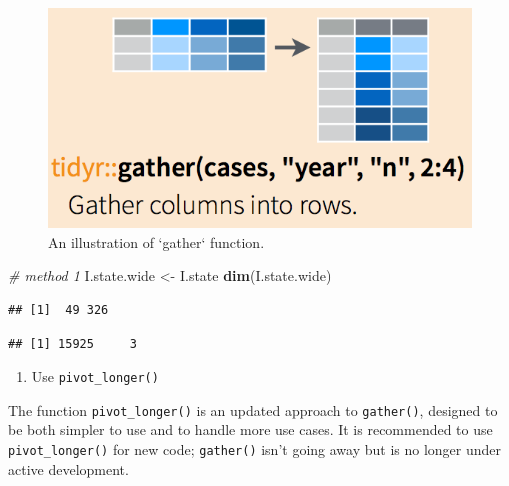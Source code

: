 \documentclass[]{book}
\newenvironment{Shaded}{\begin{snugshade}}{\end{snugshade}}
\newcommand{\KeywordTok}[1]{\textcolor[rgb]{0.13,0.29,0.53}{\textbf{#1}}}
\newcommand{\DataTypeTok}[1]{\textcolor[rgb]{0.13,0.29,0.53}{#1}}
\newcommand{\FloatTok}[1]{\textcolor[rgb]{0.00,0.00,0.81}{#1}}
\newcommand{\StringTok}[1]{\textcolor[rgb]{0.31,0.60,0.02}{#1}}
\newcommand{\CommentTok}[1]{\textcolor[rgb]{0.56,0.35,0.01}{\textit{#1}}}
\newcommand{\OtherTok}[1]{\textcolor[rgb]{0.56,0.35,0.01}{#1}}
\newcommand{\OperatorTok}[1]{\textcolor[rgb]{0.81,0.36,0.00}{\textbf{#1}}}
\newcommand{\NormalTok}[1]{#1}
\providecommand{\tightlist}{%
  \setlength{\itemsep}{0pt}\setlength{\parskip}{0pt}}
\begin{document}
\begin{figure}

{\centering \includegraphics[width=0.5\linewidth]{figures/gather} 

}

\caption{An illustration of `gather` function.}\label{fig:gather}
\end{figure}

\begin{Shaded}
\begin{Highlighting}[]
\CommentTok{# method 1}
\NormalTok{I.state.wide <-}\StringTok{ }\NormalTok{I.state }
\KeywordTok{dim}\NormalTok{(I.state.wide)  }
\end{Highlighting}
\end{Shaded}

\begin{verbatim}
## [1]  49 326
\end{verbatim}

\begin{Shaded}
\end{Shaded}

\begin{verbatim}
## [1] 15925     3
\end{verbatim}

\begin{enumerate}
\def\labelenumi{\arabic{enumi}.}
\setcounter{enumi}{1}
\tightlist
\item
  Use \texttt{pivot\_longer()}
\end{enumerate}

The function \texttt{pivot\_longer()} is an updated approach to
\texttt{gather()}, designed to be both simpler to use and to handle more
use cases. It is recommended to use \texttt{pivot\_longer()} for new
code; \texttt{gather()} isn't going away but is no longer under active
development.
\end{document}
